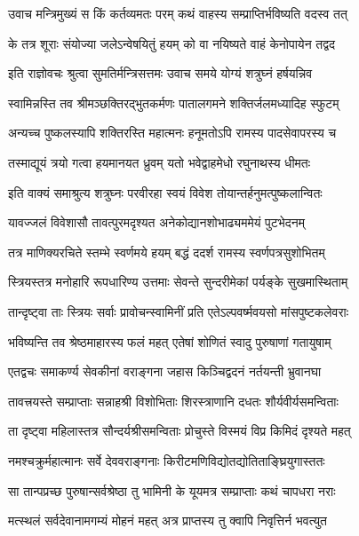 \twolineshloka
{उवाच मन्त्रिमुख्यं स किं कर्तव्यमतः परम्}
{कथं वाहस्य सम्प्राप्तिर्भविष्यति वदस्व तत्}%

\twolineshloka
{के तत्र शूराः संयोज्या जलेऽन्वेषयितुं हयम्}
{को वा नयिष्यते वाहं केनोपायेन तद्वद}%

\twolineshloka
{इति राज्ञोवचः श्रुत्वा सुमतिर्मन्त्रिसत्तमः}
{उवाच समये योग्यं शत्रुघ्नं हर्षयन्निव}%

\twolineshloka
{स्वामिन्नस्ति तव श्रीमञ्छक्तिरद्भुतकर्मणः}
{पातालगमने शक्तिर्जलमध्यादिह स्फुटम्}%

\twolineshloka
{अन्यच्च पुष्कलस्यापि शक्तिरस्ति महात्मनः}
{हनूमतोऽपि रामस्य पादसेवापरस्य च}%

\twolineshloka
{तस्माद्यूयं त्रयो गत्वा हयमानयत ध्रुवम्}
{यतो भवेद्वाहमेधो रघुनाथस्य धीमतः}%


\twolineshloka
{इति वाक्यं समाश्रुत्य शत्रुघ्नः परवीरहा}
{स्वयं विवेश तोयान्तर्हनुमत्पुष्कलान्वितः}%

\twolineshloka
{यावज्जलं विवेशासौ तावत्पुरमदृश्यत}
{अनेकोद्यानशोभाढ्यममेयं पुटभेदनम्}%

\twolineshloka
{तत्र माणिक्यरचिते स्तम्भे स्वर्णमये हयम्}
{बद्धं ददर्श रामस्य स्वर्णपत्रसुशोभितम्}%

\twolineshloka
{स्त्रियस्तत्र मनोहारि रूपधारिण्य उत्तमाः}
{सेवन्ते सुन्दरीमेकां पर्यङ्के सुखमास्थिताम्}%

\twolineshloka
{तान्दृष्ट्वा ताः स्त्रियः सर्वाः प्रावोचन्स्वामिनीं प्रति}
{एतेऽल्पवर्ष्मवयसो मांसपुष्टकलेवराः}%

\twolineshloka
{भविष्यन्ति तव श्रेष्ठमाहारस्य फलं महत्}
{एतेषां शोणितं स्वादु पुरुषाणां गतायुषाम्}%

\twolineshloka
{एतद्वचः समाकर्ण्य सेवकीनां वराङ्गना}
{जहास किञ्चिद्वदनं नर्तयन्ती भ्रुवानघा}%

\twolineshloka
{तावत्त्रयस्ते सम्प्राप्ताः सन्नाहश्री विशोभिताः}
{शिरस्त्राणानि दधतः शौर्यवीर्यसमन्विताः}%

\twolineshloka
{ता दृष्ट्वा महिलास्तत्र सौन्दर्यश्रीसमन्विताः}
{प्रोचुस्ते विस्मयं विप्र किमिदं दृश्यते महत्}%

\twolineshloka
{नमश्चक्रुर्महात्मानः सर्वे देववराङ्गनाः}
{किरीटमणिविद्योतद्योतिताङ्घ्रियुगास्ततः}%

\twolineshloka
{सा तान्पप्रच्छ पुरुषान्सर्वश्रेष्ठा तु भामिनी}
{के यूयमत्र सम्प्राप्ताः कथं चापधरा नराः}%

\twolineshloka
{मत्स्थलं सर्वदेवानामगम्यं मोहनं महत्}
{अत्र प्राप्तस्य तु क्वापि निवृत्तिर्न भवत्युत}%

